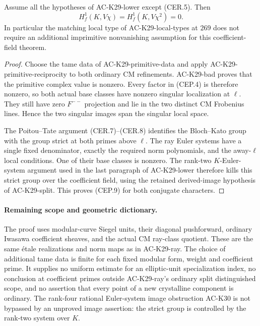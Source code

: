 \begin{theorem}
\label{AC-K29-primitive}
Assume all the hypotheses of AC-K29-lower except (CER.5).
Then
\[
       H^1_f(K,V\chi)=H^1_f(K,V\chi^2)=0.
                                                        \tag{CEP.9}
\]
In particular the matching local type of AC-K29-local-types
at $269$ does not require an additional imprimitive
nonvanishing assumption for this coefficient-field theorem.
\end{theorem}
\begin{proof}
Choose the tame data of AC-K29-primitive-data and
apply AC-K29-primitive-reciprocity to both ordinary CM
refinements.  AC-K29-bad proves that the primitive
complex value is nonzero.  Every factor in (CEP.4)
is therefore nonzero, so both actual base classes
have nonzero singular localization at $\ell$.
They still have zero $F^{--}$ projection and lie in
the two distinct CM Frobenius lines.  Hence the two
singular images span the singular local space.

The Poitou--Tate argument (CER.7)--(CER.8) identifies
the Bloch--Kato group with the group strict at both
primes above $\ell$.  The ray Euler systems have a
single fixed denominator, exactly the required norm
polynomials, and the away-$\ell$ local conditions.
One of their base classes is nonzero.
The rank-two $K$-Euler-system argument used in the
last paragraph of AC-K29-lower therefore kills this
strict group over the coefficient field, using the
retained derived-image hypothesis of AC-K29-split.
This proves (CEP.9) for both conjugate characters.
\end{proof}

\paragraph{Remaining scope and geometric dictionary.}
The proof uses modular-curve Siegel units, their diagonal
pushforward, ordinary Iwasawa coefficient sheaves, and the
actual CM ray-class quotient.  These are the same étale
realizations and norm maps as in AC-K29-ray.
The choice of additional tame data is finite for each
fixed modular form, weight and coefficient prime.
It supplies no uniform estimate for an elliptic-unit
specialization index, no conclusion at coefficient
primes outside AC-K29-ray's ordinary split
distinguished scope, and no assertion that every point
of a new crystalline component is ordinary.
The rank-four rational Euler-system image obstruction
AC-K30 is not bypassed by an unproved image assertion:
the strict group is controlled by the rank-two system
over $K$.

